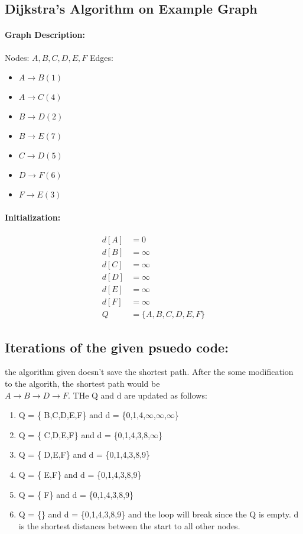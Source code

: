 \documentclass{article}
\begin{document}
\subsection*{Dijkstra’s Algorithm on Example Graph}
\paragraph{Graph Description:}
Nodes: \( A, B, C, D, E, F \)  
Edges:
\begin{itemize}
    \item \( A \to B (1) \)
    \item \( A \to C (4) \)
    \item \( B \to D (2) \)
    \item \( B \to E (7) \)
    \item \( C \to D (5) \)
    \item \( D \to F (6) \)
    \item \( F \to E (3) \)
\end{itemize}


\paragraph{Initialization:}
\[
\begin{aligned}
    d[A] &= 0 \\
    d[B] &= \infty \\
    d[C] &= \infty \\
    d[D] &= \infty \\
    d[E] &= \infty \\
    d[F] &= \infty \\
    Q &= \{A,B,C,D,E,F\}
\end{aligned}
\]
\subsection*{Iterations of the given psuedo code: }
the algorithm given doesn't save the shortest path. After the some modification to the algorith, the shortest path would be\\
 $A \longrightarrow B \longrightarrow D \longrightarrow F.$
THe Q and d are updated as follows: 
\begin{enumerate}
    \item Q = \{ B,C,D,E,F\} and d = \{0,1,4,$\infty$,$\infty$,$\infty$\}
    \item Q = \{ C,D,E,F\} and d = \{0,1,4,3,8,$\infty$\}
    \item Q = \{ D,E,F\} and d = \{0,1,4,3,8,9\}
    \item Q = \{ E,F\} and d = \{0,1,4,3,8,9\}
    \item Q = \{ F\} and d = \{0,1,4,3,8,9\}
    \item Q = \{\} and d = \{0,1,4,3,8,9\} and the loop will break since the Q is empty. d is the shortest distances between the start to all other nodes. 
\end{enumerate}
\end{document}
